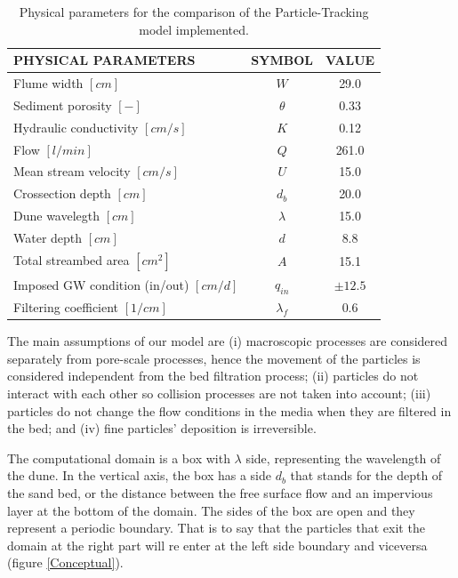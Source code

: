 \documentclass[draft,linenumbers]{agujournal2018}
\begin{document}
\begin{table}
\caption{Physical parameters \citep{Packman2000,Fox2014,Fox2018} for the comparison of the Particle-Tracking model implemented.}
\label{TF:Phys_Param}
\centering
\begin{tabular}{l c c}
\hline
PHYSICAL PARAMETERS						    & SYMBOL			& VALUE			\\
\hline
  Flume width $[cm]$  					    & $W$				& 29.0 			\\
  Sediment porosity $[-]$				    & $\theta$			& 0.33 			\\
  Hydraulic conductivity $[cm/s]$ 		    & $K$				& 0.12 			\\
  Flow $[l/min]$						    & $Q$				& 261.0			\\
  Mean stream velocity $[cm/s]$			    & $U$				& 15.0 			\\
  Crossection depth $[cm]$				    & $d_b$				& 20.0 			\\
  Dune wavelegth $[cm]$					    & $\lambda$			& 15.0 			\\
  Water depth $[cm]$					    & $d$				& 8.8 			\\
  Total streambed area $[cm^{2}]$		    & $A$				& 15.1	 		\\
  Imposed GW condition (in/out) $[cm/d]$    & $q_{in}$			& $\pm 12.5$	\\
  Filtering coefficient $[1/cm]$		    & $\lambda_f$		& 0.6			\\
\hline
\end{tabular}
\end{table}

The main assumptions of our model are (i) macroscopic processes are considered separately from pore-scale processes, hence the movement of the particles is considered independent from the bed filtration process; (ii) particles do not interact with each other so collision processes are not taken into account; (iii) particles do not change the flow conditions in the media when they are filtered in the bed; and (iv) fine particles' deposition is irreversible.

The computational domain is a box with $\lambda$ side, representing the wavelength of the dune. In the vertical axis, the box has a side $d_b$ that stands for the depth of the sand bed, or the distance between the free surface flow and an impervious layer at the bottom of the domain. The sides of the box are open and they represent a periodic boundary. That is to say that the particles that exit the domain at the right part will re enter at the left side boundary and viceversa (figure \ref{Conceptual}). 
\end{document}
